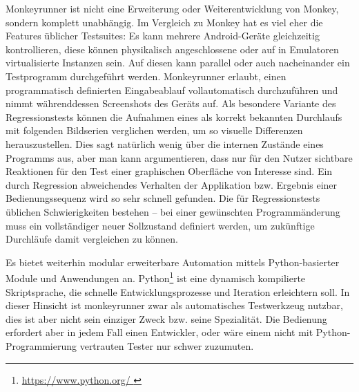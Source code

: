 Monkeyrunner ist nicht eine Erweiterung oder Weiterentwicklung von Monkey,
sondern komplett unabhängig. Im Vergleich zu Monkey hat es viel eher die
Features üblicher Testsuites: Es kann mehrere Android-Geräte
gleichzeitig kontrollieren, diese können physikalisch angeschlossene oder
auf in Emulatoren virtualisierte Instanzen sein. Auf diesen kann parallel
oder auch nacheinander ein Testprogramm durchgeführt werden. Monkeyrunner
erlaubt, einen programmatisch definierten Eingabeablauf vollautomatisch
durchzuführen und nimmt währenddessen Screenshots des Geräts auf.
Als besondere Variante des Regressionstests können die Aufnahmen eines
als \glqq{}korrekt\grqq{} bekannten Durchlaufs mit folgenden Bildserien
verglichen werden, um so visuelle Differenzen herauszustellen. Dies sagt
natürlich wenig über die internen Zustände eines Programms aus, aber
man kann argumentieren, dass nur für den Nutzer sichtbare Reaktionen
für den Test einer graphischen Oberfläche von Interesse sind. Ein durch
Regression abweichendes Verhalten der Applikation bzw. Ergebnis einer
Bedienungssequenz wird so sehr schnell gefunden. Die für Regressionstests
üblichen Schwierigkeiten bestehen -- bei einer gewünschten Programmänderung
muss ein vollständiger neuer Sollzustand definiert werden, um zukünftige
Durchläufe damit vergleichen zu können.

Es bietet weiterhin modular erweiterbare Automation mittels Python-basierter
Module und Anwendungen an. Python\footnote{ \url{ https://www.python.org/ }} 
ist eine dynamisch kompilierte Skriptsprache, die schnelle Entwicklungsprozesse
und Iteration erleichtern soll. In dieser Hinsicht ist monkeyrunner zwar
als automatisches Testwerkzeug nutzbar, dies ist aber nicht sein einziger
Zweck bzw. seine Spezialität. Die Bedienung erfordert aber in jedem Fall
einen Entwickler, oder wäre einem nicht mit Python-Programmierung vertrauten 
Tester nur schwer zuzumuten.

